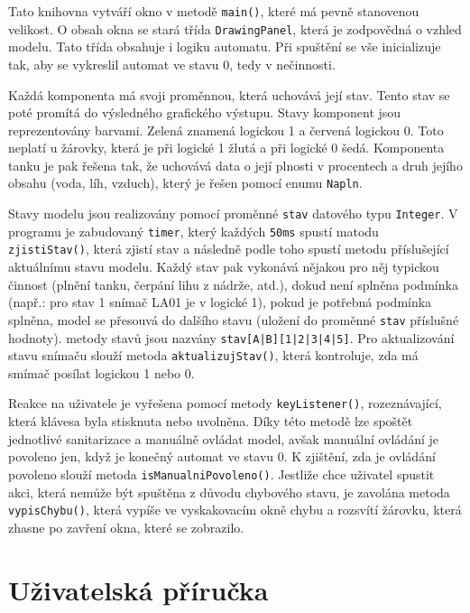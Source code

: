 \documentclass[12pt, a4paper]{article}
\begin{document}
\vspace{0.25cm}
Tato knihovna vytváří okno v metodě \texttt{main()}, které má pevně stanovenou velikost. O obsah okna se stará třída \texttt{DrawingPanel}, která je zodpovědná o vzhled modelu. Tato třída obsahuje i logiku automatu. Při spuštění se vše inicializuje tak, aby se vykreslil automat ve stavu 0, tedy v nečinnosti.

\vspace{0.25cm}
Každá komponenta má svoji proměnnou, která uchovává její stav. Tento stav se poté promítá do výsledného grafického výstupu. Stavy komponent jsou reprezentovány barvami. Zelená znamená logickou 1 a červená logickou 0. Toto neplatí u žárovky, která je při logické 1 žlutá a při logické 0 šedá. Komponenta tanku je pak řešena tak, že uchovává data o její plnosti v procentech a druh jejího obsahu (voda, líh, vzduch), který je řešen pomocí enumu \texttt{Napln}.

\vspace{0.25cm}
Stavy modelu jsou realizovány pomocí proměnné \texttt{stav} datového typu \texttt{Integer}. V programu je zabudovaný \texttt{timer}, který každých \texttt{50ms} spustí matodu \texttt{zjistiStav()}, která zjistí stav a následně podle toho spustí metodu příslušející aktuálnímu stavu modelu. Každý stav pak vykonává nějakou pro něj typickou činnost (plnění tanku, čerpání lihu z nádrže, atd.), dokud není splněna podmínka (např.: pro stav 1 snímač LA01 je v logické 1), pokud je potřebná podmínka splněna, model se přesouvá do dalšího stavu (uložení do proměnné \texttt{stav} příslušné hodnoty). metody stavů jsou nazvány \texttt{stav[A|B][1|2|3|4|5]}. Pro aktualizování stavu snímaču slouží metoda \texttt{aktualizujStav()}, která kontroluje, zda má smímač posílat logickou 1 nebo 0.

\vspace{0.25cm}
Reakce na uživatele je vyřešena pomocí metody \texttt{keyListener()}, rozeznávající, která klávesa byla stisknuta nebo uvolněna. Díky této metodě lze spoštět jednotlivé sanitarizace a manuálně ovládat model, avšak manuální ovládání je povoleno jen, když je konečný automat ve stavu 0. K zjištění, zda je ovládání povoleno slouží metoda \texttt{isManualniPovoleno()}. Jestliže chce uživatel spustit akci, která nemůže být spuštěna z důvodu chybového stavu, je zavolána metoda \texttt{vypisChybu()}, která vypíše ve vyskakovacím okně chybu a rozsvítí žárovku, která zhasne po zavření okna, které se zobrazilo.

\section{Uživatelská příručka}
\end{document}

